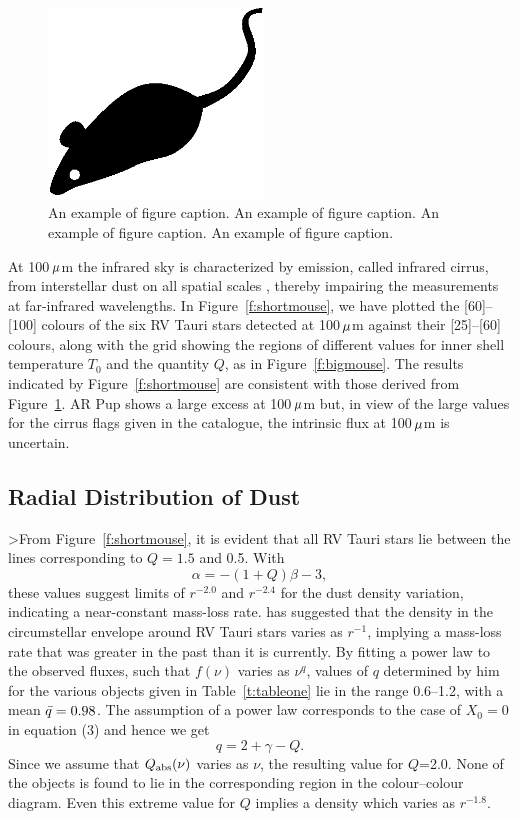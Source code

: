 \documentclass[useAMS,usenatbib]{biom}
\begin{document}
\begin{figure}
 \centerline{\includegraphics[width=2.25in]{mouse.eps}}
\caption{An example of figure caption. An example of figure
caption. An example of figure caption. An example of figure
caption.}
\label{f:mouse1column}
\end{figure}


At \hbox{100\,$\mu$m} the infrared sky is characterized by emission,
called infrared cirrus, from interstellar dust on all spatial scales
\citep{b16}, thereby impairing the measurements at far-infrared
wavelengths. \eqnbreaktop{3pc} In Figure~\ref{f:shortmouse}, we have plotted the
[60]--[100] colours of the six RV Tauri stars detected at
\hbox{100\,$\mu$m} against their [25]--[60] colours, along with the
grid showing the regions of different values for inner shell
temperature $T_0$ and the quantity $Q$, as in Figure~\ref{f:bigmouse}.
The results indicated by Figure~\ref{f:shortmouse} are consistent with
those derived from Figure~\ref{f:mouse1column}.  AR Pup shows a large
excess at \hbox{100\,$\mu$m} but, in view of the large values for the
cirrus flags given in the catalogue, the intrinsic flux at
\hbox{100\,$\mu$m} is uncertain.


\subsection{Radial Distribution of Dust}


>From Figure~\ref{f:shortmouse}, it is evident that all RV Tauri stars
lie between the lines corresponding to $Q=1.5$ and 0.5. With
 \[
  \alpha=-(1+Q)\beta-3,
 \]
 these values suggest limits of $r^{-2.0}$ and $r^{-2.4}$ for the dust
density variation, indicating a near-constant mass-loss rate.
\citet{b12} has suggested that the density in the circumstellar
envelope around RV Tauri stars varies as $r^{-1}$, implying a
mass-loss rate that was greater in the past than it is currently.  By
fitting a power law to the observed fluxes, such that $f(\nu)$ varies
as $\nu^q$, values of $q$ determined by him for the various objects
given in Table~\ref{t:tableone} lie in the range 0.6--1.2, with a mean
$\skew5\bar q=0.98$. The assumption of a power law corresponds to the
case of $X_0=0$ in equation (3) and hence we get
 \[
  q=2+\gamma -Q.
 \]
Since we assume that $Q_{{\mathrm{abs}}}(\nu)$ varies as $\nu$, the
resulting value for $Q$=2.0. None of the objects is found to lie in the
corresponding region in the colour--colour diagram. Even this extreme
value for $Q$ implies a density which varies as $r^{-1.8}$.
\end{document}
